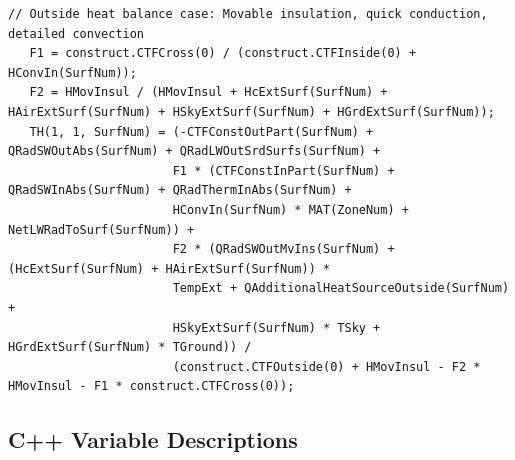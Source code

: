 \begin{lstlisting}
// Outside heat balance case: Movable insulation, quick conduction, detailed convection
   F1 = construct.CTFCross(0) / (construct.CTFInside(0) + HConvIn(SurfNum));
   F2 = HMovInsul / (HMovInsul + HcExtSurf(SurfNum) + HAirExtSurf(SurfNum) + HSkyExtSurf(SurfNum) + HGrdExtSurf(SurfNum));
   TH(1, 1, SurfNum) = (-CTFConstOutPart(SurfNum) + QRadSWOutAbs(SurfNum) + QRadLWOutSrdSurfs(SurfNum) +
                       F1 * (CTFConstInPart(SurfNum) + QRadSWInAbs(SurfNum) + QRadThermInAbs(SurfNum) + 
                       HConvIn(SurfNum) * MAT(ZoneNum) + NetLWRadToSurf(SurfNum)) +
                       F2 * (QRadSWOutMvIns(SurfNum) + (HcExtSurf(SurfNum) + HAirExtSurf(SurfNum)) * 
                       TempExt + QAdditionalHeatSourceOutside(SurfNum) +
                       HSkyExtSurf(SurfNum) * TSky + HGrdExtSurf(SurfNum) * TGround)) /
                       (construct.CTFOutside(0) + HMovInsul - F2 * HMovInsul - F1 * construct.CTFCross(0));
\end{lstlisting}

\subsection{C++ Variable Descriptions}\label{c++-variable-descriptions}

